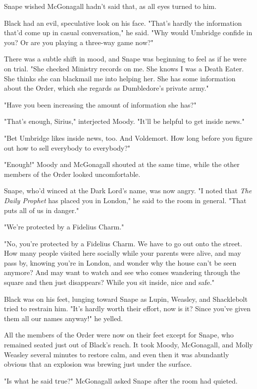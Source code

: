Snape wished McGonagall hadn't said that, as all eyes turned to him.

Black had an evil, speculative look on his face. "That's hardly the information that'd come up in casual conversation," he said. "Why would Umbridge confide in you? Or are you playing a three-way game now?"

There was a subtle shift in mood, and Snape was beginning to feel as if he were on trial. "She checked Ministry records on me. She knows I was a Death Eater. She thinks she can blackmail me into helping her. She has some information about the Order, which she regards as Dumbledore's private army."

"Have you been increasing the amount of information she has?"

"That's enough, Sirius," interjected Moody. "It'll be helpful to get inside news."

"Bet Umbridge likes inside news, too. And Voldemort. How long before you figure out how to sell everybody to everybody?"

"Enough!" Moody and McGonagall shouted at the same time, while the other members of the Order looked uncomfortable.

Snape, who'd winced at the Dark Lord's name, was now angry. "I noted that \emph{The Daily Prophet} has placed you in London," he said to the room in general. "That puts all of us in danger."

"We're protected by a Fidelius Charm."

"No, you're protected by a Fidelius Charm. We have to go out onto the street. How many people visited here socially while your parents were alive, and may pass by, knowing you're in London, and wonder why the house can't be seen anymore? And may want to watch and see who comes wandering through the square and then just disappears? While you sit inside, nice and safe."

Black was on his feet, lunging toward Snape as Lupin, Weasley, and Shacklebolt tried to restrain him. "It's hardly worth their effort, now is it? Since you've given them all our names anyway!" he yelled.

All the members of the Order were now on their feet except for Snape, who remained seated just out of Black's reach. It took Moody, McGonagall, and Molly Weasley several minutes to restore calm, and even then it was abundantly obvious that an explosion was brewing just under the surface.

"Is what he said true?" McGonagall asked Snape after the room had quieted.

